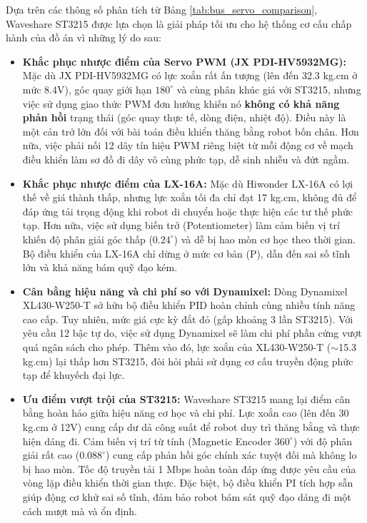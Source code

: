 Dựa trên các thông số phân tích từ Bảng \ref{tab:bus_servo_comparison}, Waveshare ST3215 được lựa chọn là giải pháp tối ưu cho hệ thống cơ cấu chấp hành của đồ án vì những lý do sau:

\begin{itemize}
    \item \textbf{Khắc phục nhược điểm của Servo PWM (JX PDI-HV5932MG):} Mặc dù JX PDI-HV5932MG có lực xoắn rất ấn tượng (lên đến 32.3 kg.cm ở mức 8.4V), góc quay giới hạn $180^{\circ}$ và cùng phân khúc giá với ST3215, nhưng việc sử dụng giao thức PWM đơn hướng khiến nó \textbf{không có khả năng phản hồi} trạng thái (góc quay thực tế, dòng điện, nhiệt độ). Điều này là một cản trở lớn đối với bài toán điều khiển thăng bằng robot bốn chân. Hơn nữa, việc phải nối 12 dây tín hiệu PWM riêng biệt từ mỗi động cơ về mạch điều khiển làm sơ đồ đi dây vô cùng phức tạp, dễ sinh nhiễu và đứt ngầm. 
    \item \textbf{Khắc phục nhược điểm của LX-16A:} Mặc dù Hiwonder LX-16A có lợi thế về giá thành thấp, nhưng lực xoắn tối đa chỉ đạt 17 kg.cm, không đủ để đáp ứng tải trọng động khi robot di chuyển hoặc thực hiện các tư thế phức tạp. Hơn nữa, việc sử dụng biến trở (Potentiometer) làm cảm biến vị trí khiến độ phân giải góc thấp ($0.24^{\circ}$) và dễ bị hao mòn cơ học theo thời gian. Bộ điều khiển của LX-16A chỉ dừng ở mức cơ bản (P), dẫn đến sai số tĩnh lớn và khả năng bám quỹ đạo kém.
    \item \textbf{Cân bằng hiệu năng và chi phí so với Dynamixel:} Dòng Dynamixel XL430-W250-T sở hữu bộ điều khiển PID hoàn chỉnh cùng nhiều tính năng cao cấp. Tuy nhiên, mức giá cực kỳ đắt đỏ (gấp khoảng 3 lần ST3215). Với yêu cầu 12 bậc tự do, việc sử dụng Dynamixel sẽ làm chi phí phần cứng vượt quá ngân sách cho phép. Thêm vào đó, lực xoắn của XL430-W250-T ($\sim$15.3 kg.cm) lại thấp hơn ST3215, đòi hỏi phải sử dụng cơ cấu truyền động phức tạp để khuyếch đại lực.
    \item \textbf{Ưu điểm vượt trội của ST3215:} Waveshare ST3215 mang lại điểm cân bằng hoàn hảo giữa hiệu năng cơ học và chi phí. Lực xoắn cao (lên đến 30 kg.cm ở 12V) cung cấp dư dả công suất để robot duy trì thăng bằng và thực hiện dáng đi. Cảm biến vị trí từ tính (Magnetic Encoder $360^{\circ}$) với độ phân giải rất cao ($0.088^{\circ}$) cung cấp phản hồi góc chính xác tuyệt đối mà không lo bị hao mòn. Tốc độ truyền tải 1 Mbps hoàn toàn đáp ứng được yêu cầu của vòng lặp điều khiển thời gian thực. Đặc biệt, bộ điều khiển PI tích hợp sẵn giúp động cơ khử sai số tĩnh, đảm bảo robot bám sát quỹ đạo dáng đi một cách mượt mà và ổn định.

\end{itemize}
